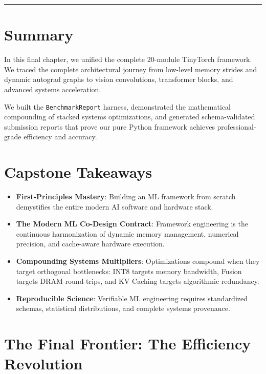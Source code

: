 \documentclass[
  letterpaper,
]{scrbook}
\providecommand{\tightlist}{%
  \setlength{\itemsep}{0pt}\setlength{\parskip}{0pt}}
\begin{document}
\begin{center}\rule{0.5\linewidth}{0.5pt}\end{center}

\section{Summary}\label{summary-20}

In this final chapter, we unified the complete 20-module TinyTorch
framework. We traced the complete architectural journey from low-level
memory strides and dynamic autograd graphs to vision convolutions,
transformer blocks, and advanced systems acceleration.

We built the \texttt{BenchmarkReport} harness, demonstrated the
mathematical compounding of stacked systems optimizations, and generated
schema-validated submission reports that prove our pure Python framework
achieves professional-grade efficiency and accuracy.

\section{Capstone Takeaways}\label{capstone-takeaways}

\begin{itemize}
\tightlist
\item
  \textbf{First-Principles Mastery}: Building an ML framework from
  scratch demystifies the entire modern AI software and hardware stack.
\item
  \textbf{The Modern ML Co-Design Contract}: Framework engineering is
  the continuous harmonization of dynamic memory management, numerical
  precision, and cache-aware hardware execution.
\item
  \textbf{Compounding Systems Multipliers}: Optimizations compound when
  they target orthogonal bottlenecks: INT8 targets memory bandwidth,
  Fusion targets DRAM round-trips, and KV Caching targets algorithmic
  redundancy.
\item
  \textbf{Reproducible Science}: Verifiable ML engineering requires
  standardized schemas, statistical distributions, and complete systems
  provenance.
\end{itemize}

\section{The Final Frontier: The Efficiency
Revolution}\label{the-final-frontier-the-efficiency-revolution}
\end{document}

